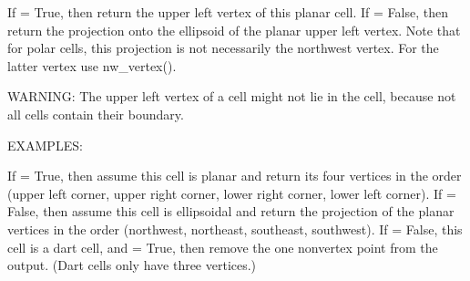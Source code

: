\documentclass[a4paper,12ptopenany,oneside,english]{sphinxmanual}
\begin{document}
\begin{fulllineitems}
\begin{fulllineitems}
\end{fulllineitems}


\begin{fulllineitems}
\label{\detokenize{dggs:rhealpixdggs.dggs.Cell.ul_vertex}}
\pysigstartsignatures
{}
\pysigstopsignatures
\sphinxAtStartPar
If  = True, then return the upper left vertex of this
planar cell.
If  = False, then return the projection onto the ellipsoid
of the planar upper left vertex.
Note that for polar cells, this projection is not necessarily the
northwest vertex.
For the latter vertex use nw\_vertex().

\sphinxAtStartPar
WARNING: The upper left vertex of a cell might not lie in the cell,
because not all cells contain their boundary.

\sphinxAtStartPar
EXAMPLES:

\begin{sphinxVerbatim}[commandchars=\\\{\}]
   \PYG{p}{[} \PYG{p}{]}
   
\end{sphinxVerbatim}

\end{fulllineitems}


\begin{fulllineitems}
\label{\detokenize{dggs:rhealpixdggs.dggs.Cell.vertices}}
\pysigstartsignatures
{}
\pysigstopsignatures
\sphinxAtStartPar
If  = True, then assume this cell is planar and return
its four vertices in the order (upper left corner, upper right corner,
lower right corner, lower left corner).
If  = False, then assume this cell is ellipsoidal and return
the projection of the planar vertices in the order
(northwest, northeast, southeast, southwest).
If  = False, this cell is a dart cell, and
 = True, then remove the one non\sphinxhyphen{}vertex point from
the output. (Dart cells only have three vertices.)


\end{fulllineitems}
\end{fulllineitems}
\end{document}
